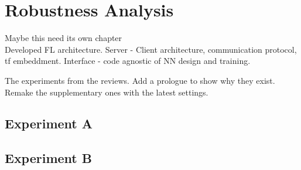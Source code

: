 \chapter{Robustness Analysis}
\label{Chapter-Robustness-Analysis}

Maybe this need its own chapter\\
Developed FL architecture. Server - Client architecture, communication protocol, tf embeddment. Interface - code agnostic of NN design and training.

The experiments from the reviews. Add a prologue to show why they exist. Remake the supplementary ones with the latest settings.


\section{Experiment A}
\section{Experiment B}
